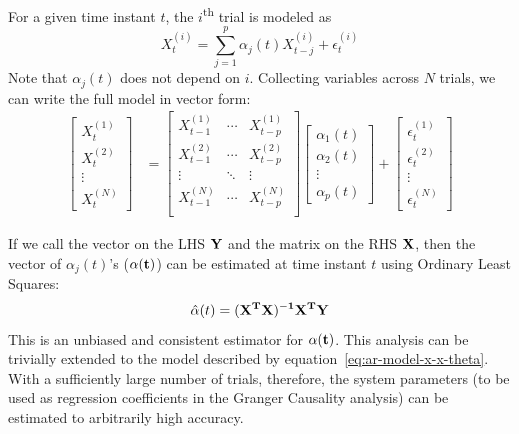 \documentclass[letterpaper, 10pt, conference]{ieeeconf}
\begin{document}
For a given time instant $t$, the $i$\textsuperscript{th} trial is modeled as
\begin{equation*}
	X_t^{(i)} = \sum_{j=1}^p \alpha_j(t) X_{t-j}^{(i)} + \epsilon_t^{(i)}
\end{equation*}
Note that $\alpha_j(t)$ does not depend on $i$. Collecting variables across $N$ trials, we can write the full model in vector form:
\begin{align*}
	\left[ \begin{array}{c}
			X_t^{(1)} \\
			X_t^{(2)} \\
			\vdots \\
			X_t^{(N)}
	\end{array} \right]
	&=
	\left[ \begin{array}{ccc}
			X_{t-1}^{(1)} & \cdots & X_{t-p}^{(1)} \\
			X_{t-1}^{(2)} & \cdots & X_{t-p}^{(2)} \\
			\vdots & \ddots & \vdots \\
			X_{t-1}^{(N)} & \cdots & X_{t-p}^{(N)} \\
	\end{array} \right]
	\left[ \begin{array}{c}
			\alpha_1(t) \\
			\alpha_2(t) \\
			\vdots \\
			\alpha_p(t)
	\end{array} \right] +
	\left[ \begin{array}{c}
			\epsilon_t^{(1)} \\
			\epsilon_t^{(2)} \\
			\vdots \\
			\epsilon_t^{(N)}
	\end{array} \right]
\end{align*}

If we call the vector on the LHS $\bf{Y}$ and the matrix on the RHS $\bf{X}$, then the vector of $\alpha_j(t)$'s ($\bf{\alpha}(t)$) can be estimated at time instant $t$ using Ordinary Least Squares:
\begin{equation*}
\hat{\bf{\alpha}}(t) = (\bf{X}^T \bf{X})^{-1} \bf{X}^T \bf{Y}
\end{equation*}
This is an unbiased and consistent estimator for $\bf{\alpha}(t)$. This analysis can be trivially extended to the model described by equation~\eqref{eq:ar-model-x-x-theta}. With a sufficiently large number of trials, therefore, the system parameters (to be used as regression coefficients in the Granger Causality analysis) can be estimated to arbitrarily high accuracy.
\end{document}
